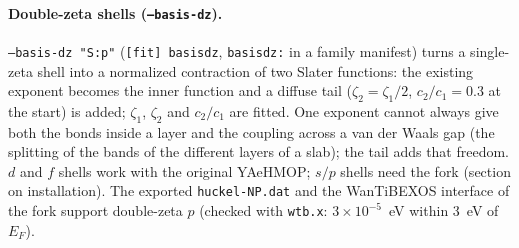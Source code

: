 \documentclass[11pt,a4paper]{article}
\newcommand{\cmd}[1]{\texttt{#1}}
\renewcommand{\_}{\origunderscore\allowbreak}
\begin{document}
\paragraph{Double-zeta shells (\cmd{--basis-dz}).} \cmd{--basis-dz "S:p"} (\cmd{[fit] basis\_dz},
\cmd{basis\_dz:} in a family manifest) turns a single-zeta shell into a normalized contraction of two
Slater functions: the existing exponent becomes the inner function and a diffuse tail
($\zeta_2=\zeta_1/2$, $c_2/c_1=0.3$ at the start) is added; $\zeta_1$, $\zeta_2$ and $c_2/c_1$ are fitted.
One exponent cannot always give both the bonds inside a layer and the coupling across a van der Waals gap
(the splitting of the bands of the different layers of a slab); the tail adds that freedom. $d$ and $f$ shells
work with the original YAeHMOP; $s/p$ shells need the fork (section on installation). The exported
\cmd{huckel-NP.dat} and the WanTiBEXOS interface of the fork support double-zeta $p$ (checked with
\cmd{wtb.x}: $3\times10^{-5}$~eV within 3~eV of $E_F$).
\end{document}
